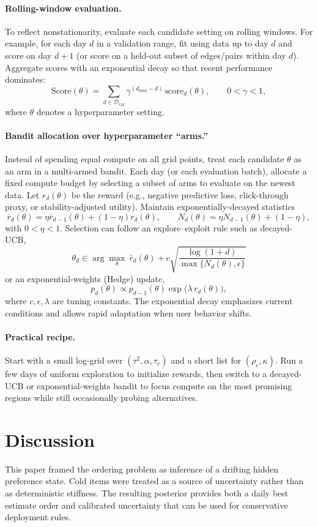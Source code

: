 \documentclass[11pt]{article}
\begin{document}
\paragraph{Rolling-window evaluation.}
To reflect nonstationarity, evaluate each candidate setting on rolling windows.
For example, for each day $d$ in a validation range, fit using data up to day $d$ and score on day $d+1$
(or score on a held-out subset of edges/pairs within day $d$).
Aggregate scores with an exponential decay so that recent performance dominates:
\[
\mathrm{Score}(\theta)
=
\sum_{d\in\mathcal D_{\mathrm{val}}} \gamma^{(d_{\max}-d)}\,\mathrm{score}_d(\theta),
\qquad 0<\gamma<1,
\]
where $\theta$ denotes a hyperparameter setting.

\paragraph{Bandit allocation over hyperparameter ``arms.''}
Instead of spending equal compute on all grid points, treat each candidate $\theta$ as an arm in a multi-armed bandit.
Each day (or each evaluation batch), allocate a fixed compute budget by selecting a subset of arms to evaluate on the newest data.
Let $r_d(\theta)$ be the reward (e.g., negative predictive loss, click-through proxy, or stability-adjusted utility).
Maintain exponentially-decayed statistics
\[
\bar r_d(\theta)=\eta\bar r_{d-1}(\theta)+(1-\eta)r_d(\theta),
\qquad
N_d(\theta)=\eta N_{d-1}(\theta)+(1-\eta),
\]
with $0<\eta<1$.
Selection can follow an explore--exploit rule such as decayed-UCB,
\[
\theta_d\in\arg\max_{\theta}\ \bar r_d(\theta)+c\sqrt{\frac{\log(1+d)}{\max\{N_d(\theta),\epsilon\}}}
\]
or an exponential-weights (Hedge) update,
\[
p_d(\theta)\propto p_{d-1}(\theta)\exp\big(\lambda\,r_d(\theta)\big),
\]
where $c,\epsilon,\lambda$ are tuning constants.
The exponential decay emphasizes current conditions and allows rapid adaptation when user behavior shifts.

\paragraph{Practical recipe.}
Start with a small log-grid over $(\tau^2,\alpha,\tau_e)$ and a short list for $(\rho_c,\kappa)$.
Run a few days of uniform exploration to initialize rewards, then switch to a decayed-UCB or exponential-weights bandit
to focus compute on the most promising regions while still occasionally probing alternatives.

\section{Discussion}
This paper framed the ordering problem as inference of a drifting hidden preference state.
Cold items were treated as a source of uncertainty rather than as deterministic stiffness.
The resulting posterior provides both a daily best estimate order and calibrated uncertainty that can be used for conservative deployment rules.
\end{document}
